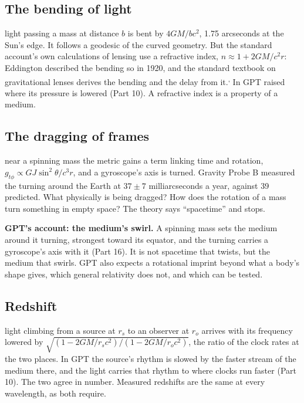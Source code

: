 \subsection{The bending of light}

 light passing a mass at distance $b$ is bent by $4GM/bc^2$, 1.75 arcseconds at the Sun's edge. It follows a geodesic of the curved geometry. But the standard account's own calculations of lensing use a refractive index, $n \approx 1 + 2GM/c^2r$: Eddington described the bending so in 1920, and the standard textbook on gravitational lenses derives the bending and the delay from it.\textsuperscript{,} In GPT  raised where its pressure is lowered (Part 10). A refractive index is a property of a medium.

\subsection{The dragging of frames}

 near a spinning mass the metric gains a term linking time and rotation, $g_{t\phi} \propto GJ\sin^2\theta/c^3r$, and a gyroscope's axis is turned. Gravity Probe B measured the turning around the Earth at $37\pm7$ milliarcseconds a year, against 39 predicted. What physically is being dragged? How does the rotation of a mass turn something in empty space? The theory says ``spacetime'' and stops.

\begin{hypbar}
\textbf{GPT's account: the medium's swirl.} A spinning mass sets the medium around it turning, strongest toward its equator, and the turning carries a gyroscope's axis with it (Part 16).\footnotemark{} It is not spacetime that twists, but the medium that swirls. GPT also expects a rotational imprint beyond what a body's shape gives, which general relativity does not, and which can be tested.
\end{hypbar}

\subsection{Redshift}

 light climbing from a source at $r_s$ to an observer at $r_o$ arrives with its frequency lowered by $\sqrt{(1-2GM/r_sc^2)/(1-2GM/r_oc^2)}$, the ratio of the clock rates at the two places. In GPT  the source's rhythm is slowed by the faster stream of the medium there, and the light carries that rhythm to where clocks run faster (Part 10). The two agree in number. Measured redshifts are the same at every wavelength, as both require.

